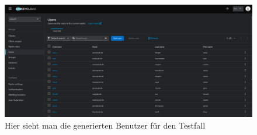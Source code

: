 \documentclass[a4paper,12pt]{article}
\begin{document}
	\begin{figure}[H]
		\centering
		\includegraphics[scale=1.5, width=\linewidth]{screenshot011}
		\caption{Hier sieht man die generierten Benutzer für den Testfall}
		\label{fig:screenshot011}
	\end{figure}
	
\end{document}
